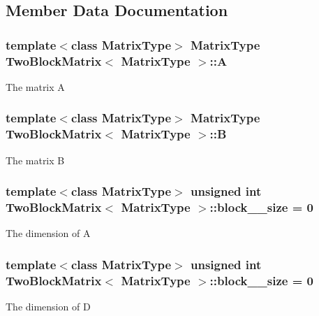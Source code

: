 \subsection{Member Data Documentation}
\subsubsection[{\texorpdfstring{A}{A}}]{\setlength{\rightskip}{0pt plus 5cm}template$<$class Matrix\+Type$>$ Matrix\+Type {\bf Two\+Block\+Matrix}$<$ Matrix\+Type $>$\+::A\hspace{0.3cm}{\ttfamily [protected]}}\hypertarget{class_two_block_matrix_a91b02f00cf56b398e1624227e6efc8c6}{}\label{class_two_block_matrix_a91b02f00cf56b398e1624227e6efc8c6}
The matrix A 
\subsubsection[{\texorpdfstring{B}{B}}]{\setlength{\rightskip}{0pt plus 5cm}template$<$class Matrix\+Type$>$ Matrix\+Type {\bf Two\+Block\+Matrix}$<$ Matrix\+Type $>$\+::B\hspace{0.3cm}{\ttfamily [protected]}}\hypertarget{class_two_block_matrix_ae8edfe1cd2298741586dcc46a4d09ebf}{}\label{class_two_block_matrix_ae8edfe1cd2298741586dcc46a4d09ebf}
The matrix B 
\subsubsection[{\texorpdfstring{block\+\_\+0\+\_\+size}{block_0_size}}]{\setlength{\rightskip}{0pt plus 5cm}template$<$class Matrix\+Type$>$ unsigned int {\bf Two\+Block\+Matrix}$<$ Matrix\+Type $>$\+::block\+\_\+\_\+size = 0\hspace{0.3cm}{\ttfamily [protected]}}\hypertarget{class_two_block_matrix_ae862db333ed43f1650d4926f237cfc43}{}\label{class_two_block_matrix_ae862db333ed43f1650d4926f237cfc43}
The dimension of A 
\subsubsection[{\texorpdfstring{block\+\_\+1\+\_\+size}{block_1_size}}]{\setlength{\rightskip}{0pt plus 5cm}template$<$class Matrix\+Type$>$ unsigned int {\bf Two\+Block\+Matrix}$<$ Matrix\+Type $>$\+::block\+\_\+\_\+size = 0\hspace{0.3cm}{\ttfamily [protected]}}\hypertarget{class_two_block_matrix_a60ddea1d26313aac35cfb2ae9f192cb2}{}\label{class_two_block_matrix_a60ddea1d26313aac35cfb2ae9f192cb2}
The dimension of D 
